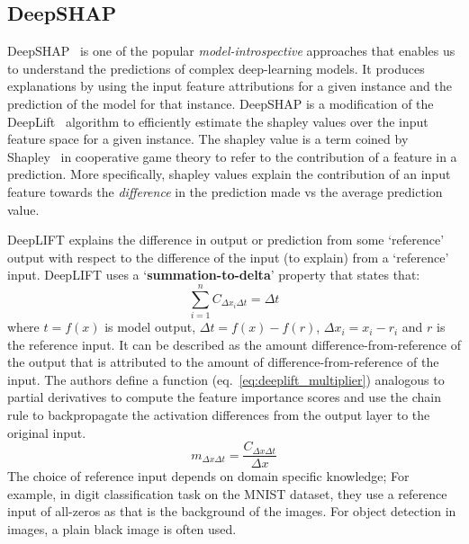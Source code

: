 \subsection{DeepSHAP}\label{sec:deepshap_approach}
DeepSHAP~\citep{Lundberg17} is one of the popular \textit{model-introspective} approaches that enables us to understand the predictions of complex deep-learning models. It produces explanations by using the input feature attributions for a given instance and the prediction of the model for that instance. DeepSHAP is a modification of the DeepLift~\citep{ShrikumarGK17} algorithm to efficiently estimate the shapley values over the input feature space for a given instance. The shapley value is a term coined by Shapley~\citep{shapley1953value} in cooperative game theory to refer to the contribution of a feature in a prediction. More specifically, shapley values explain the contribution of an input feature towards the \emph{difference} in the prediction made vs the average prediction value.

DeepLIFT explains the difference in output or prediction from some `reference' output with respect to the difference of the input (to explain) from a `reference' input. DeepLIFT uses a `\textbf{summation-to-delta}' property that states that:
\begin{equation}\label{eq:sum_to_delta}
    \overset{n}{\underset{i=1}{\sum}}C_{\Delta x_i \Delta t} = \Delta t
\end{equation}
where $t=f(x)$ is model output, $\Delta t=f(x) - f(r)$, $\Delta x_i= x_i - r_i$ and $r$ is the reference input. It can be described as the amount difference-from-reference of the output that is attributed to the amount of difference-from-reference of the input. The authors define a function (eq.~\ref{eq:deeplift_multiplier}) analogous to partial derivatives to compute the feature importance scores and use the chain rule to backpropagate the activation differences from the output layer to the original input.
\begin{equation}\label{eq:deeplift_multiplier}
    m_{\Delta x \Delta t} = \frac{C_{\Delta x \Delta t}}{\Delta x}
\end{equation}
The choice of reference input depends on domain specific knowledge; For example, in digit classification task on the MNIST dataset, they use a reference input of all-zeros as that is the background of the images. For object detection in images, a plain black image is often used.